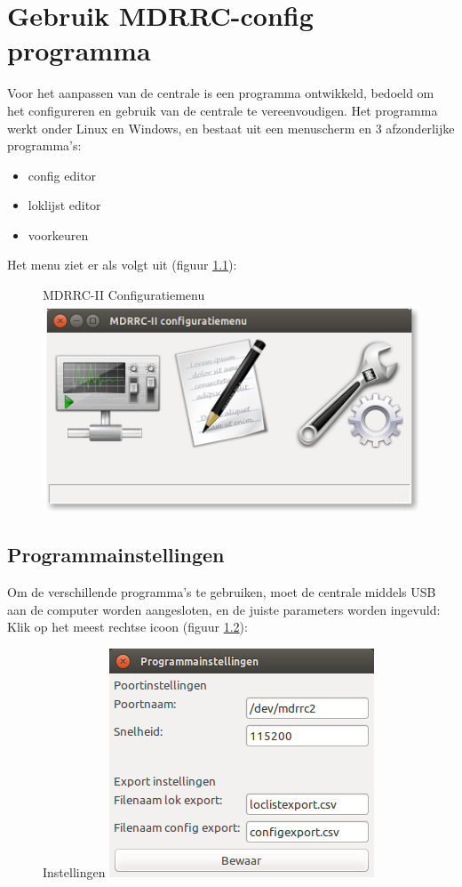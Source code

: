 \documentclass[12pt,a4paper]{report}
\begin{document}
\chapter{Gebruik MDRRC-config programma}
\label{ch:config}
Voor het aanpassen van de centrale is een programma ontwikkeld, bedoeld om het configureren en gebruik van de centrale te vereenvoudigen.
Het programma werkt onder Linux en Windows, en bestaat uit een menuscherm en 3 afzonderlijke programma's:
\begin{itemize}
\item config editor
\item loklijst editor
\item voorkeuren
\end{itemize}

Het menu ziet er als volgt uit (figuur \ref{scs:menu}):\\

\begin{figure}[!ht]
  \captionbox
  {MDRRC-II Configuratiemenu\label{scs:menu}}
  {\includegraphics[scale=0.5]{images/rcu_screenshot1}\\}
\end{figure}

\section{Programmainstellingen}

Om de verschillende programma's te gebruiken, moet de centrale middels USB aan de computer worden aangesloten, en de juiste parameters worden ingevuld:
Klik op het meest rechtse icoon (figuur \ref{scs:settings}):

\begin{figure}[!ht]
  \captionbox
  {Instellingen\label{scs:settings}}
  {\includegraphics[scale=0.5]{images/rcu_screenshot2}\\}
\end{figure}
\end{document}
